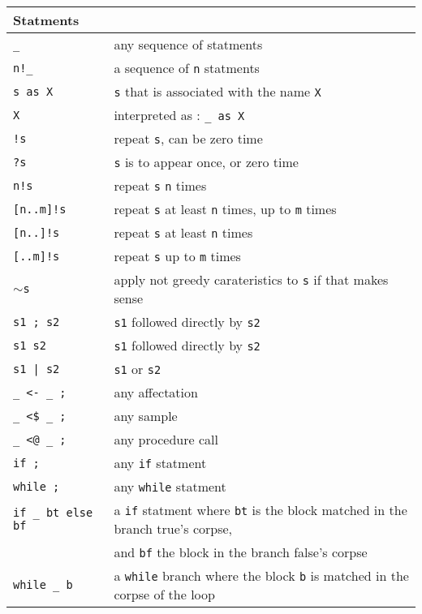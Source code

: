 \begin{tabular}{| l | l |}
  \hline
  Statments&\\
  \hline
  \texttt{\_} & any sequence of statments \\
  \texttt{n!\_} & a sequence of  \texttt{n} statments \\
  \texttt{s as X} &  \texttt{s} that is associated with the name  \texttt{X}\\
  \texttt{X} & interpreted as : \texttt{\_ as X} \\
  \hline
  \texttt{!s} & repeat  \texttt{s}, can be zero time \\
  \texttt{?s} &  \texttt{s} is to appear once, or zero time \\
  \texttt{n!s} & repeat  \texttt{s}  \texttt{n} times \\
  \texttt{[n..m]!s} & repeat  \texttt{s} at least  \texttt{n} times, up to  \texttt{m} times \\
  \texttt{[n..]!s} & repeat  \texttt{s} at least  \texttt{n} times \\
  \texttt{[..m]!s} & repeat  \texttt{s} up to  \texttt{m} times \\
  \texttt{$\sim$s} & apply not greedy carateristics to  \texttt{s} if that makes sense\\
  \hline
  \texttt{s1 ; s2} &  \texttt{s1} followed directly by  \texttt{s2} \\
  \texttt{s1 s2} &  \texttt{s1} followed directly by  \texttt{s2} \\
  \texttt{s1 | s2} &  \texttt{s1} or  \texttt{s2} \\
  \hline
  \texttt{\_ <- \_ ;} & any affectation \\
  \texttt{\_ <\$ \_ ;} & any sample \\
  \texttt{\_ <@ \_ ;} & any procedure call \\
  \texttt{if ;} & any  \texttt{if} statment \\
  \texttt{while ;} & any  \texttt{while} statment \\
  \texttt{if \_ bt else bf} & a \texttt{if} statment where  \texttt{bt} is the 
  block matched in the branch true's corpse,\\
  & and  \texttt{bf} the block in the branch false's corpse\\
  \texttt{while \_ b} & a \texttt{while} branch where the block  \texttt{b}
  is matched in the corpse of the loop\\
  \hline
\end{tabular}

